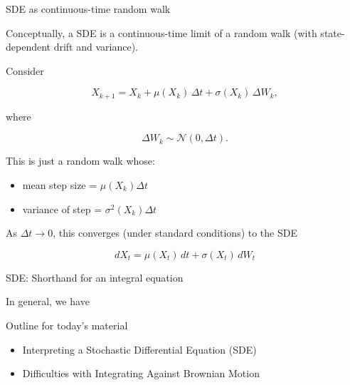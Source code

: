 \documentclass[10pt]{beamer}
\begin{document}
\begin{frame}{SDE as continuous-time random walk}

Conceptually, a SDE is a continuous-time limit of a random walk (with state-dependent drift and variance).

\pause 
\vfill 
Consider

\[ X_{k+1} = X_k 
+
\mu(X_k)\,\Delta t
+
\sigma(X_k)\,\Delta W_k,
\]

where

\[\Delta W_k \sim \mathcal N(0,\Delta t). \]

\vfill 
\pause 
This is just a random walk whose:

\begin{itemize}
\item mean step size = $ \mu(X_k)\Delta t $
\item variance of step = $ \sigma^2(X_k)\Delta t $
\end{itemize}

\vfill 
\pause 

As $\Delta t \to 0$, this converges (under standard conditions) to the SDE

\[ dX_t = \mu(X_t) \, dt + \sigma(X_t)\,dW_t \]


\end{frame}
	


\begin{frame}{SDE: Shorthand for an integral equation}

In general, we have



\end{frame}


\begin{frame}[standout]
Outline for today's material
\begin{itemize}
\item \textbullet \quad Interpreting a Stochastic Differential Equation (SDE)
\item \textbullet \quad \alert{Difficulties with Integrating Against Brownian Motion}
\end{itemize}

\end{frame}
\end{document}
